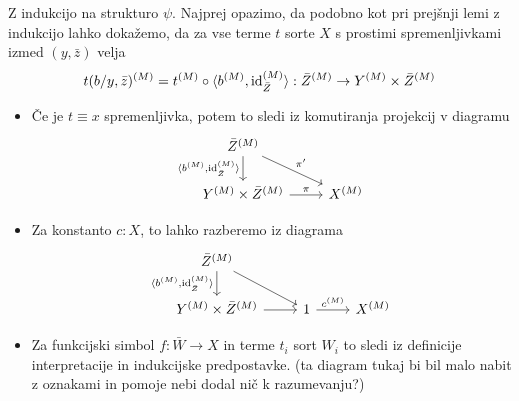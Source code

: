 \documentclass[../kategoricna_logika.tex]{subfiles}
\begin{document}
\begin{dokaz}
  Z indukcijo na strukturo $\psi$.  Najprej opazimo, da podobno kot
  pri prejšnji lemi z indukcijo lahko dokažemo, da za vse terme $t$
  sorte $X$ s prostimi spremenljivkami izmed $(y, \bar{z})$ velja
  $$t(b/y, \bar{z})^{(M)} = t^{(M)} \circ \langle b^{(M)}, \mathrm{id}_{\bar{Z}}^{(M)} \rangle : \bar{Z}^{(M)} \to Y^{(M)} \times \bar{Z}^{(M)}$$
  \begin{itemize}
  \item Če je $t \equiv x$ spremenljivka, potem to sledi iz
    komutiranja projekcij v diagramu
    \begin{equation*}
      \begin{tikzcd}
        \bar{Z}^{(M)} \ar[d, "\fprod{b^{(M)}, \mathrm{id}_{\bar{Z}}^{(M)}}"'] \ar[dr, "\pi'"] & \\
        Y^{(M)} \times \bar{Z}^{(M)} \ar[r, "\pi"] & X^{(M)}
      \end{tikzcd}
    \end{equation*}
    
  \item Za konstanto ${c : X}$, to lahko razberemo iz diagrama
    \begin{equation*}
      \begin{tikzcd}
        \bar{Z}^{(M)} \ar[d, "\fprod{b^{(M)}, \mathrm{id}_{\bar{Z}}^{(M)}}"'] \ar[dr] & & \\
        Y^{(M)} \times \bar{Z}^{(M)} \ar[r] & 1 \ar[r, "c^{(M)}"] &
        X^{(M)}
      \end{tikzcd}
    \end{equation*}

  \item Za funkcijski simbol $f : \bar{W} \to X$ in terme $t_i$ sort
    $W_i$ to sledi iz definicije interpretacije in indukcijske
    predpostavke.  (ta diagram tukaj bi bil malo nabit z oznakami in
    pomoje nebi dodal nič k razumevanju?)
  \end{itemize}


\end{dokaz}
\end{document}
